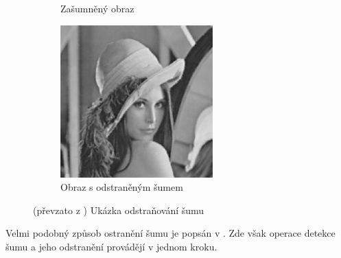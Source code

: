 \documentclass[a4paper,10pt]{article}
\begin{document}
\begin{figure}
\begin{subfigure}[t]{0.3\textwidth}
      \caption{Zašumněný obraz}
    \end{subfigure}%
%
    \begin{subfigure}[t]{0.3\textwidth}
      \includegraphics[width=\textwidth]{noises3}
      \caption{Obraz s odstraněným šumem}
    \end{subfigure}
    
    \caption{(převzato z \cite{SadRetKam-EfMetImpNoiRedImFuzCelAut}) Ukázka odstraňování šumu} \label{img:Noises}
\end{figure}

Velmi podobný způsob ostranění šumu je popsán v \cite{SahUguSah-SalPepNoiFilFuzCelAut}. Zde však operace detekce šumu a jeho odstranění provádějí v jednom kroku.

\end{document}
